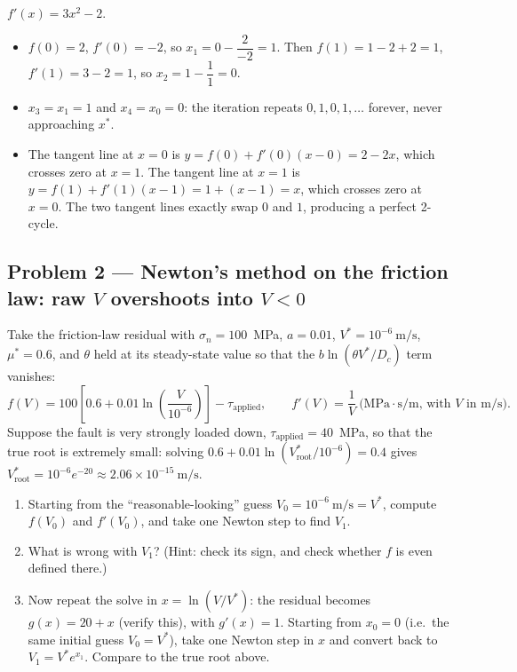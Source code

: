 \solution $f'(x) = 3x^2-2$.
\begin{itemize}
\item[(a)] $f(0)=2$, $f'(0)=-2$, so $x_1 = 0 - \dfrac{2}{-2} = 1$. Then $f(1)=1-2+2=1$, $f'(1)=3-2=1$, so $x_2 = 1 - \dfrac{1}{1} = 0$.
\item[(b)] $x_3 = x_1 = 1$ and $x_4 = x_0 = 0$: the iteration repeats $0,1,0,1,\dots$ forever, never approaching $x^\ast$.
\item[(c)] The tangent line at $x=0$ is $y = f(0)+f'(0)(x-0) = 2-2x$, which crosses zero at $x=1$. The tangent line at $x=1$ is $y=f(1)+f'(1)(x-1) = 1+(x-1)=x$, which crosses zero at $x=0$. The two tangent lines exactly swap $0$ and $1$, producing a perfect 2-cycle.
\end{itemize}


\subsection*{Problem 2 --- Newton's method on the friction law: raw $V$ overshoots into $V<0$}

Take the friction-law residual with $\sigma_n=100$~MPa, $a=0.01$, $V^\ast=10^{-6}\ \mathrm{m/s}$, $\mu^\ast=0.6$, and $\theta$ held at its steady-state value so that the $b\ln(\theta V^\ast/D_c)$ term vanishes:
\begin{equation*}
f(V) = 100\left[0.6 + 0.01\ln\!\left(\frac{V}{10^{-6}}\right)\right] - \tau_{\mathrm{applied}}, \qquad f'(V) = \frac{1}{V}\ \text{(MPa$\cdot$s/m, with $V$ in m/s)}.
\end{equation*}
Suppose the fault is very strongly loaded down, $\tau_{\mathrm{applied}} = 40$~MPa, so that the true root is extremely small: solving $0.6+0.01\ln(V^\ast_{\mathrm{root}}/10^{-6})=0.4$ gives $V^\ast_{\mathrm{root}} = 10^{-6}e^{-20} \approx 2.06\times10^{-15}\ \mathrm{m/s}$.

\begin{enumerate}[label=(\alph*)]
\item Starting from the ``reasonable-looking'' guess $V_0 = 10^{-6}\ \mathrm{m/s} = V^\ast$, compute $f(V_0)$ and $f'(V_0)$, and take one Newton step to find $V_1$.
\item What is wrong with $V_1$? (Hint: check its sign, and check whether $f$ is even defined there.)
\item Now repeat the solve in $x = \ln(V/V^\ast)$: the residual becomes $g(x) = 20 + x$ (verify this), with $g'(x)=1$. Starting from $x_0=0$ (i.e.\ the same initial guess $V_0=V^\ast$), take one Newton step in $x$ and convert back to $V_1 = V^\ast e^{x_1}$. Compare to the true root above.
\end{enumerate}

